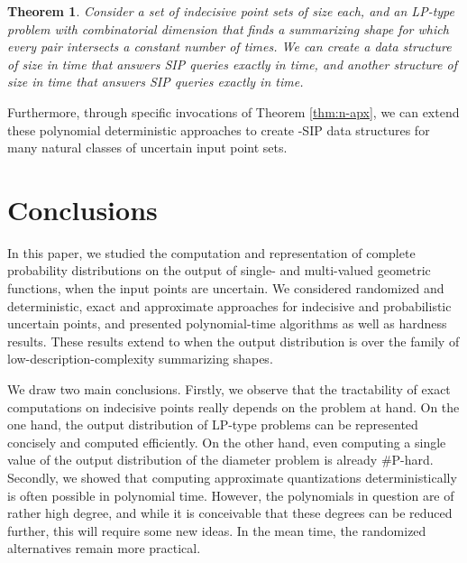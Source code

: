 \documentclass{journal}
\newtheorem {theorem}{Theorem}[section]
\begin{document}
\begin{theorem}
Consider a set  of  indecisive point sets of size  each, and an LP-type problem  with combinatorial dimension  that finds a summarizing shape for which every pair intersects a constant number of times.  
We can create a data structure of size  in time  that answers SIP queries exactly in  time, 
and another structure of size  in time  that answers SIP queries exactly in  time.  
\end{theorem}


Furthermore, through specific invocations of Theorem \ref{thm:n-apx}, we can extend these polynomial deterministic approaches to create -SIP data structures for many natural classes of uncertain input point sets.  

































\section {Conclusions}

In this paper, we studied the computation and representation of complete probability distributions on the output of single- and multi-valued geometric functions, when the input points are uncertain. 
We considered randomized and deterministic, exact and approximate approaches for indecisive and probabilistic uncertain points, and presented polynomial-time algorithms as well as hardness results.
These results extend to when the output distribution is over the family of low-description-complexity summarizing shapes. 

We draw two main conclusions.
Firstly, we observe that the tractability of exact computations on indecisive points really depends on the problem at hand. On the one hand, the output distribution of LP-type problems can be represented concisely and computed efficiently. On the other hand, even computing a single value of the output distribution of the diameter problem is already \#P-hard.
Secondly, we showed that computing approximate quantizations deterministically is often possible in polynomial time. However, the polynomials in question are of rather high degree, and while it is conceivable that these degrees can be reduced further, this will require some new ideas. In the mean time, the randomized alternatives remain more practical.
\end{document}
